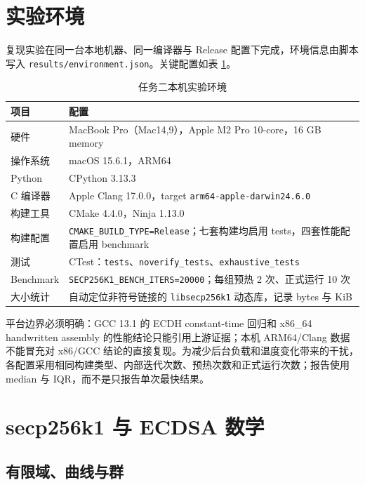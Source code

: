 \documentclass[11pt,a4paper,fontset=none]{ctexart}
\begin{document}
\section{实验环境}

复现实验在同一台本地机器、同一编译器与 Release 配置下完成，环境信息由脚本写入 \texttt{results/environment.json}。关键配置如表 \ref{tab:environment}。

\begin{table}[htbp]
\centering
\caption{任务二本机实验环境}
\label{tab:environment}
\begin{tabular}{p{}p{}}
\toprule
项目 & 配置 \\
\midrule
硬件 & MacBook Pro（Mac14,9），Apple M2 Pro 10-core，16 GB memory \\
操作系统 & macOS 15.6.1，ARM64 \\
Python & CPython 3.13.3 \\
C 编译器 & Apple Clang 17.0.0，target \texttt{arm64-apple-darwin24.6.0} \\
构建工具 & CMake 4.4.0，Ninja 1.13.0 \\
构建配置 & \texttt{CMAKE\_BUILD\_TYPE=Release}；七套构建均启用 tests，四套性能配置启用 benchmark \\
测试 & CTest：\texttt{tests}、\texttt{noverify\_tests}、\texttt{exhaustive\_tests} \\
Benchmark & \texttt{SECP256K1\_BENCH\_ITERS=20000}；每组预热 2 次、正式运行 10 次 \\
大小统计 & 自动定位非符号链接的 \texttt{libsecp256k1} 动态库，记录 bytes 与 KiB \\
\bottomrule
\end{tabular}
\end{table}

平台边界必须明确：GCC 13.1 的 ECDH constant-time 回归和 x86\_64 handwritten assembly 的性能结论只能引用上游证据；本机 ARM64/Clang 数据不能冒充对 x86/GCC 结论的直接复现。为减少后台负载和温度变化带来的干扰，各配置采用相同构建类型、内部迭代次数、预热次数和正式运行次数；报告使用 median 与 IQR，而不是只报告单次最快结果。

\section{secp256k1 与 ECDSA 数学}

\subsection{有限域、曲线与群}
\end{document}
